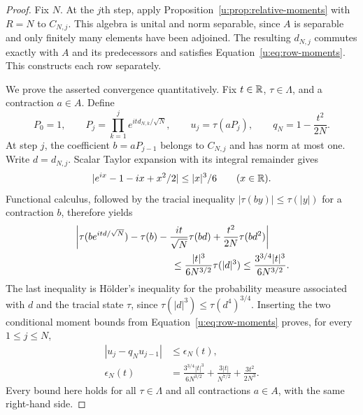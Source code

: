 \begin{proof}
Fix $N$.  At the $j$th step, apply
Proposition~\ref{u:prop:relative-moments} with $R=N$ to $C_{N,j}$.
This algebra is unital and norm separable, since $A$ is separable and
only finitely many elements have been adjoined.  The resulting
$d_{N,j}$ commutes exactly with $A$ and its predecessors and satisfies
Equation~\eqref{u:eq:row-moments}.  This constructs each row separately.

We prove the asserted convergence quantitatively.  Fix $t\in\mathbb R$,
$\tau\in\Lambda$, and a contraction $a\in A$.  Define
\[
  P_0=1,\qquad
  P_j=\prod_{k=1}^j e^{itd_{N,k}/\sqrt N},\qquad
  u_j=\tau(aP_j),\qquad
  q_N=1-\frac{t^2}{2N}.
\]
At step $j$, the coefficient $b=aP_{j-1}$ belongs to $C_{N,j}$ and
has norm at most one.  Write $d=d_{N,j}$.  Scalar Taylor expansion
with its integral remainder gives
\[
  |e^{ix}-1-ix+x^2/2|\leq |x|^3/6
  \qquad(x\in\mathbb R).
\]
Functional calculus, followed by the tracial inequality
$|\tau(by)|\leq\tau(|y|)$ for a contraction $b$, therefore yields
\begin{align*}
 &\left|\tau(be^{itd/\sqrt N})-\tau(b)
       -\frac{it}{\sqrt N}\tau(bd)
       +\frac{t^2}{2N}\tau(bd^2)\right|\\
 &\hspace{35mm}\leq
       \frac{|t|^3}{6N^{3/2}}\tau(|d|^3)
       \leq\frac{3^{3/4}|t|^3}{6N^{3/2}}.
\end{align*}
The last inequality is H\"older's inequality for the probability
measure associated with $d$ and the tracial state $\tau$, since
$\tau(|d|^3)\leq\tau(d^4)^{3/4}$.  Inserting the two conditional
moment bounds from Equation~\eqref{u:eq:row-moments} proves, for every
$1\leq j\leq N$,
\begin{equation}
\label{u:eq:clt-recurrence}
\begin{split}
  |u_j-q_Nu_{j-1}|&\leq\epsilon_N(t),\\
  \epsilon_N(t)&=
    \frac{3^{3/4}|t|^3}{6N^{3/2}}
    +\frac{3|t|}{N^{7/2}}
    +\frac{3t^2}{2N^3}.
\end{split}
\end{equation}
Every bound here holds for all $\tau\in\Lambda$ and all contractions
$a\in A$, with the same right-hand side.


\end{proof}
